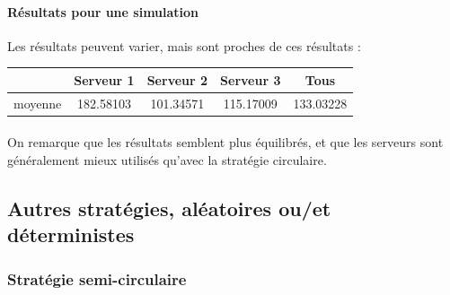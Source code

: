 \documentclass{article}
\begin{document}
\paragraph{Résultats pour une simulation}
Les résultats peuvent varier, mais sont proches de ces résultats :
\begin{center}
	\begin{tabular}{c|ccc|c}
		\hline \hline
		& Serveur 1 & Serveur 2 & Serveur 3 & Tous \\
		\hline
		moyenne & 182.58103 & 101.34571 & 115.17009 & 133.03228 \\
		\hline \hline
	\end{tabular}
\end{center}
\paragraph{}
On remarque que les résultats semblent plus équilibrés, et que les serveurs sont généralement mieux utilisés qu'avec la stratégie circulaire.

\subsection{Autres stratégies, aléatoires ou/et déterministes}

\subsubsection{Stratégie semi-circulaire}
\end{document}
